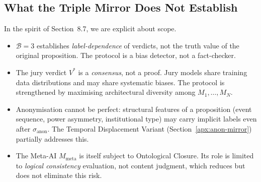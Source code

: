\documentclass[11pt,a4paper]{article}
\theoremstyle{definition}
\theoremstyle{plain}
\theoremstyle{remark}
\begin{document}
\subsection{What the Triple Mirror Does Not Establish}
\label{apx:triple-mirror-limits}

In the spirit of Section~8.7, we are explicit about scope.

\begin{itemize}[itemsep=4pt]
  \item $\mathcal{B} = 3$ establishes \emph{label-dependence}
    of verdicts, not the truth value of the original
    proposition.
    The protocol is a bias detector, not a fact-checker.
  \item The jury verdict $V^*$ is a \emph{consensus}, not a
    proof. Jury models share training data distributions and
    may share systematic biases.
    The protocol is strengthened by maximising architectural
    diversity among $M_1, \ldots, M_N$.
  \item Anonymisation cannot be perfect: structural features
    of a proposition (event sequence, power asymmetry,
    institutional type) may carry implicit labels even after
    $\sigma_{\mathrm{anon}}$.
    The Temporal Displacement Variant
    (Section~\cref{apx:anon-mirror}) partially addresses this.
  \item The Meta-AI $M_{\mathrm{meta}}$ is itself subject to
    Ontological Closure.
    Its role is limited to \emph{logical consistency}
    evaluation, not content judgment, which reduces but does
    not eliminate this risk.
\end{itemize}
\end{document}
